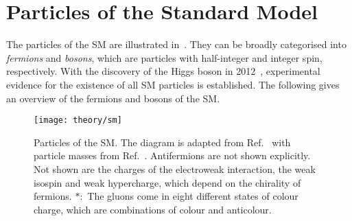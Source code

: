 \section{Particles of the Standard Model}%
\label{sec:sm_overview}

The particles of the SM are illustrated in~. They can be
broadly categorised into \emph{fermions} and \emph{bosons}, which are particles
with half-integer and integer spin, respectively. With the discovery of the
Higgs boson in 2012~\cite{HIGG-2012-27,CMS-HIG-12-028}, experimental evidence
for the existence of all SM particles is established. The following gives an
overview of the fermions and bosons of the SM.


\begin{figure}[htbp]
  \centering

  \texttt{[image: theory/sm]}

  \caption[Particles of the SM.]{Particles of the SM. The diagram is adapted
    from Ref.~\cite{sm_tikz} with particle masses from
    Ref.~\cite{pdg2020}. Antifermions are not shown explicitly.  Not shown are
    the charges of the electroweak interaction, the weak isospin and weak
    hypercharge, which depend on the chirality of fermions. $*$:~The gluons come
    in eight different states of colour charge, which are combinations of colour
    and anticolour.}%
  \label{fig:sm_particles}
\end{figure}

